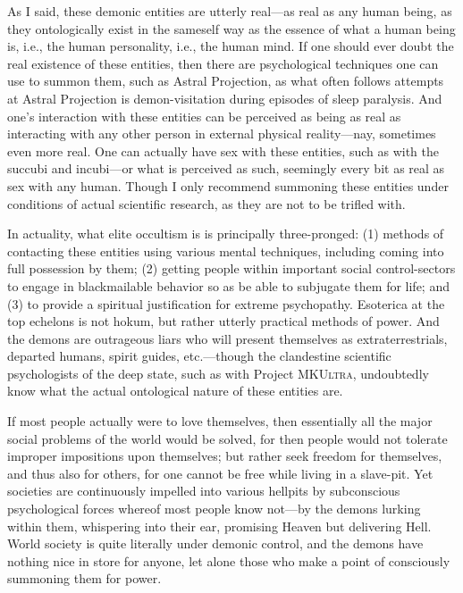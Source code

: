 \documentclass[letterpaper,12pt]{article}
\begin{document}
As I said, these demonic entities are utterly real---as real as any human being, as they ontologically exist in the sameself way as the essence of what a human being is, i.e., the human personality, i.e., the human mind. If one should ever doubt the real existence of these entities, then there are psychological techniques one can use to summon them, such as Astral Projection, as what often follows attempts at Astral Projection is demon-visitation during episodes of sleep paralysis. And one's interaction with these entities can be perceived as being as real as interacting with any other person in external physical reality---nay, sometimes even more real. One can actually have sex with these entities, such as with the succubi and incubi---or what is perceived as such, seemingly every bit as real as sex with any human. Though I only recommend summoning these entities under conditions of actual scientific research, as they are not to be trifled with.

In actuality, what elite occultism is is principally three-pronged: (1) methods of contacting these entities using various mental techniques, including coming into full possession by them; (2) getting people within important social control-sectors to engage in blackmailable behavior so as be able to subjugate them for life; and (3) to provide a spiritual justification for extreme psychopathy. Esoterica at the top echelons is not hokum, but rather utterly practical methods of power. And the demons are outrageous liars who will present themselves as extraterrestrials, departed humans, spirit guides, etc.---though the clandestine scientific psychologists of the deep state, such as with Project \textsc{MKUltra}, undoubtedly know what the actual ontological nature of these entities are.

If most people actually were to love themselves, then essentially all the major social problems of the world would be solved, for then people would not tolerate improper impositions upon themselves; but rather seek freedom for themselves, and thus also for others, for one cannot be free while living in a slave-pit. Yet societies are continuously impelled into various hellpits by subconscious psychological forces whereof most people know not---by the demons lurking within them, whispering into their ear, promising Heaven but delivering Hell. World society is quite literally under demonic control, and the demons have nothing nice in store for anyone, let alone those who make a point of consciously summoning them for power.
\end{document}
